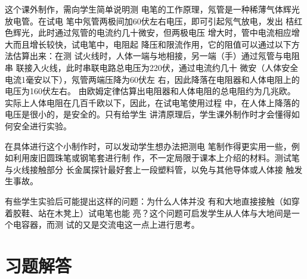 这个课外制作，需向学生简单说明测
电笔的工作原理，氖管是一种稀薄气体辉光放电管。在试电
笔中氖管两极间加60伏左右电压，即可引起氖气放电，发出
桔红色辉光，此时通过氖管的电流约几十微安，但两极电压
增大时，管中电流相应增大而且增长较快，试电笔中，电阻起
降压和限流作用，它的阻值可以通过以下方法估算出来：在测
试火线时，人体一端与地相接，另一端（手）通过氖管与电阻串
联接入火线，此时串联电路总电压为220伏，通过电流约几十
微安（人体安全电流1毫安以下），氖管两端压降为60伏左
右，因此降落在电阻器和人体电阻上的电压为160伏左右。
由欧姆定律估算出电阻器和人体电阻的总电阻约为几兆欧。
实际上人体电阻在几百千欧以下，因此，在试电笔使用过程
中，在人体上降落的电压是很小的，是安全的。只有给学生
讲清原理后，学生课外制作时才会懂得如何安全进行实验。

在具体进行这个小制作时，可以发动学生想办法把测电
笔制作得更实用一些，例如利用废旧圆珠笔或钢笔套进行制
作，不一定局限于课本上介绍的材料。测试笔与火线接触部分
长金属探针最好套上一段塑料管，以免与其他导体或人体接
触发生事故。

有些学生实验后可能提出这样的问题：为什么人体并没
有和大地直接接触（如穿着胶鞋、站在木凳上）试电笔也能
亮？这个问题可启发学生从人体与大地间是一个电容器，而测
试的又是交流电这一点上进行思考。

\section{习题解答}
